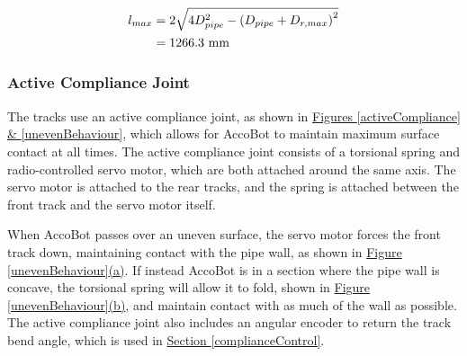 \documentclass[11pt]{article}		%
\newcommand{\sectref}[1]{\hyperref[#1]{Section \ref*{#1}}}     %
\begin{document}
    			\begin{align}
    				l_{max} &= 2 \sqrt{4D_{pipe}^2 - \left( D_{pipe} + D_{r,max}\right) ^ 2}
    				\\
    				&= 1266.3 \ \mathrm{mm} \notag
    			\end{align}
			
			\subsubsection{Active Compliance Joint}
			
				The tracks use an active compliance joint, as shown in \hyperref[activeCompliance]{Figures \ref*{activeCompliance} \& \ref*{unevenBehaviour}}, which allows for AccoBot to maintain maximum surface contact at all times.
				The active compliance joint consists of a torsional spring and radio-controlled servo motor, which are both attached around the same axis.
				The servo motor is attached to the rear tracks, and the spring is attached between the front track and the servo motor itself.
				
				When AccoBot passes over an uneven surface, the servo motor forces the front track down, maintaining contact with the pipe wall, as shown in \hyperref[unevenBehaviour]{Figure \ref*{unevenBehaviour}(a)}.
				If instead AccoBot is in a section where the pipe wall is concave, the torsional spring will allow it to fold, shown in \hyperref[unevenBehaviour]{Figure \ref*{unevenBehaviour}(b)}, and maintain contact with as much of the wall as possible.
				The active compliance joint also includes an angular encoder to return the track bend angle, which is used in \sectref{complianceControl}.
							
\end{document}

